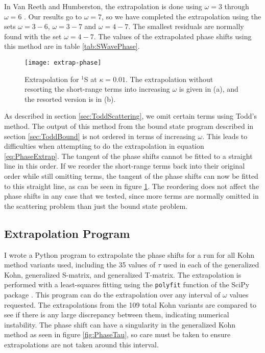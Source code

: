 \documentclass[Dissertation.tex]{subfiles}
\begin{document}
In Van Reeth and Humberston, the extrapolation is done using $\omega = 3$ through $\omega = 6$ \cite{VanReeth2003}. Our results go to $\omega = 7$, so we have completed the extrapolation using the sets $\omega = 3-6$, $\omega = 3-7$ and $\omega = 4-7$. The smallest residuals are normally found with the set $\omega = 4-7$. The values of the extrapolated phase shifts using this method are in table \ref{tab:SWavePhase}.

\begin{figure}[H]
	\centering
	\texttt{[image: extrap-phase]}
	\caption[Extrapolation for $^1$S at $\kappa = 0.01$]{Extrapolation for $^1$S at $\kappa = 0.01$. The extrapolation without resorting the short-range terms into increasing $\omega$ is given in (a), and the resorted version is in (b).}
	\label{fig:extrap-phase}
\end{figure}

As described in section \ref{sec:ToddScattering}, we omit certain terms using Todd's method. The output of this method from the bound state program described in section \ref{sec:ToddBound} is not ordered in terms of increasing $\omega$. This leads to difficulties when attempting to do the extrapolation in equation \ref{eq:PhaseExtrap}. The tangent of the phase shifts cannot be fitted to a straight line in this order. If we reorder the short-range terms back into their original order while still omitting terms, the tangent of the phase shifts can now be fitted to this straight line, as can be seen in figure \ref{fig:extrap-phase}. The reordering does not affect the phase shifts in any case that we tested, since more terms are normally omitted in the scattering problem than just the bound state problem.

\subsection{Extrapolation Program}
I wrote a Python \cite{Python} program to extrapolate the phase shifts for a run for all Kohn method variants used, including the 35 values of $\tau$ used in each of the generalized Kohn, generalized S-matrix, and generalized T-matrix. The extrapolation is performed with a least-squares fitting using the \texttt{polyfit} function of the SciPy package \cite{SciPy}. This program can do the extrapolation over any interval of $\omega$ values requested. The extrapolations from the 109 total Kohn variants are compared to see if there is any large discrepancy between them, indicating numerical instability. The phase shift can have a singularity in the generalized Kohn method as seen in figure \ref{fig:PhaseTau}, so care must be taken to ensure extrapolations are not taken around this interval.
\end{document}
